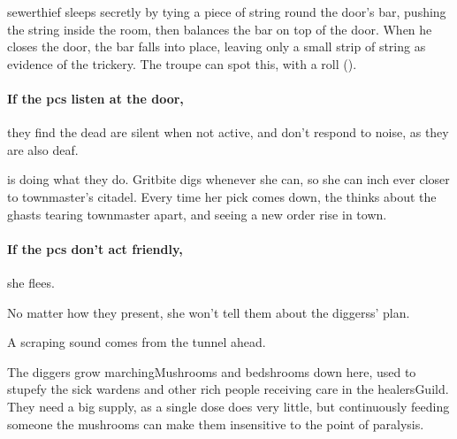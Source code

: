 \begin{multicols}{2}
\Gls{sewerthief} sleeps secretly by tying a piece of string round the door's bar, pushing the string inside the room, then balances the bar on top of the door.
When he closes the door, the bar falls into place, leaving only a small strip of string as evidence of the trickery.
The troupe can spot this, with a  roll (\tn[13]).

\paragraph{If the \glspl{pc} listen at the door,}
they find the dead are silent when not active, and don't respond to noise, as they are also deaf.%



\begin{exampletext}
   is doing what they do.
  Gritbite digs whenever she can, so she can inch ever closer to \gls{townmaster}'s citadel.
  Every time her pick comes down, the thinks about the ghasts tearing \gls{townmaster} apart, and seeing a new order rise in \gls{town}.
\end{exampletext}

\paragraph{If the \glspl{pc} don't act friendly,}
she flees.

No matter how they present, she won't tell them about the \glspl{diggers}' plan.

\begin{boxtext}
  A scraping sound comes from the tunnel ahead.
\end{boxtext}



The \gls{diggers} grow \glspl{marchingMushroom} and \glspl{bedshroom} down here, used to stupefy the sick \glspl{warden} and other rich people receiving care in the \gls{healersGuild}.
They need a big supply, as a single dose does very little, but continuously feeding someone the mushrooms can make them insensitive to the point of paralysis.


\end{multicols}
